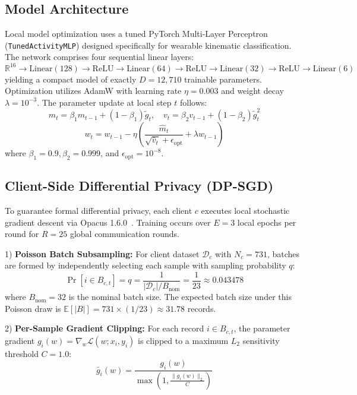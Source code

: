 \documentclass[journal,twocolumn,10pt]{IEEEtran}
\begin{document}
\subsection{Model Architecture}
Local model optimization uses a tuned PyTorch Multi-Layer Perceptron (\texttt{TunedActivityMLP}) designed specifically for wearable kinematic classification. The network comprises four sequential linear layers:
\begin{equation}
\mathbb{R}^{16} \to \text{Linear}(128) \to \text{ReLU} \to \text{Linear}(64) \to \text{ReLU} \to \text{Linear}(32) \to \text{ReLU} \to \text{Linear}(6)
\end{equation}
yielding a compact model of exactly $D = 12,710$ trainable parameters. Optimization utilizes AdamW with learning rate $\eta = 0.003$ and weight decay $\lambda = 10^{-3}$. The parameter update at local step $t$ follows:
\begin{equation}
m_t = \beta_1 m_{t-1} + (1 - \beta_1) \tilde{g}_t, \quad v_t = \beta_2 v_{t-1} + (1 - \beta_2) \tilde{g}_t^2
\end{equation}
\begin{equation}
w_t = w_{t-1} - \eta \left( \frac{\hat{m}_t}{\sqrt{\hat{v}_t} + \epsilon_{\text{opt}}} + \lambda w_{t-1} \right)
\end{equation}
where $\beta_1 = 0.9, \beta_2 = 0.999$, and $\epsilon_{\text{opt}} = 10^{-8}$.

\subsection{Client-Side Differential Privacy (DP-SGD)}
To guarantee formal differential privacy, each client $c$ executes local stochastic gradient descent via Opacus 1.6.0~\cite{yousefpour2021opacus}. Training occurs over $E = 3$ local epochs per round for $R = 25$ global communication rounds.

1) \textbf{Poisson Batch Subsampling:} For client dataset $\mathcal{D}_c$ with $N_c = 731$, batches are formed by independently selecting each sample with sampling probability $q$:
\begin{equation}
\Pr[i \in B_{c,t}] = q = \frac{1}{|\mathcal{D}_c| / B_{\text{nom}}} = \frac{1}{23} \approx 0.043478
\end{equation}
where $B_{\text{nom}} = 32$ is the nominal batch size. The expected batch size under this Poisson draw is $\mathbb{E}[|B|] = 731 \times (1/23) \approx 31.78$ records.

2) \textbf{Per-Sample Gradient Clipping:} For each record $i \in B_{c,t}$, the parameter gradient $g_i(w) = \nabla_w \mathcal{L}(w; x_i, y_i)$ is clipped to a maximum $L_2$ sensitivity threshold $C = 1.0$:
\begin{equation}
\bar{g}_i(w) = \frac{g_i(w)}{\max\left(1, \frac{\|g_i(w)\|_2}{C}\right)}
\end{equation}
\end{document}
